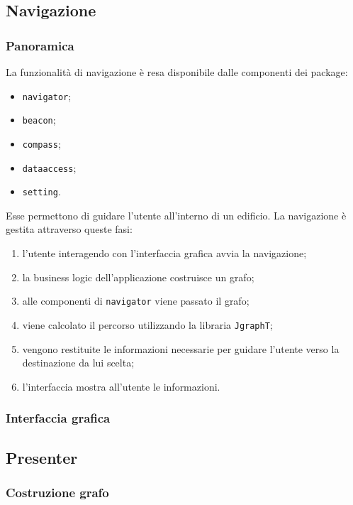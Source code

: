 
\subsection{Navigazione}

		\subsubsection{Panoramica}
			La funzionalità di navigazione è resa disponibile dalle componenti dei package:
			\begin{itemize}
				\item \verb|navigator|;
				\item \verb|beacon|;
				\item \verb|compass|;
				\item \verb|dataaccess|;
				\item \verb|setting|.
			\end{itemize}
			Esse permettono di guidare l'utente all'interno di un edificio.
			La navigazione è gestita attraverso queste fasi:
			\begin{enumerate}
				\item l'utente interagendo con l'interfaccia grafica avvia la navigazione;
				\item la business logic dell'applicazione costruisce un grafo;
				\item alle componenti di \verb|navigator| viene passato il grafo;
				\item viene calcolato il percorso utilizzando la libraria \verb|JgraphT|;
				\item vengono restituite le informazioni necessarie per guidare l'utente verso la destinazione da lui scelta;
				\item l'interfaccia mostra all'utente le informazioni.
			\end{enumerate}
			
		\subsubsection{Interfaccia grafica}
		
		\subsection{Presenter}
		
		\subsubsection{Costruzione grafo}
		
